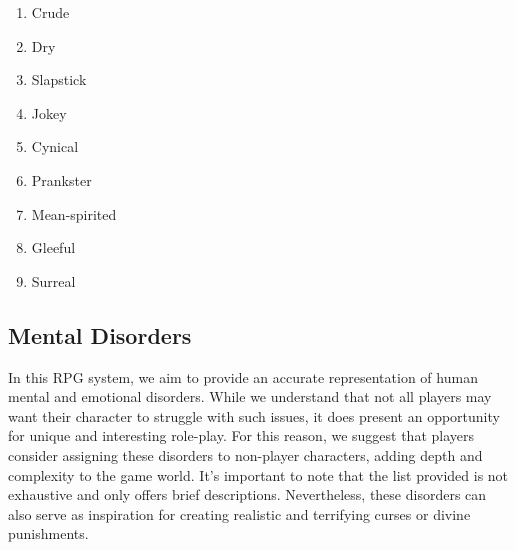 \begin{enumerate}[itemsep=0.4em]
    \item Crude
    \item Dry
    \item Slapstick
    \item Jokey
    \item Cynical
    \item Prankster
    \item Mean-spirited
    \item Gleeful
    \item Surreal
\end{enumerate}

\subsection{\textbf{Mental Disorders}}

In this RPG system, we aim to provide an accurate representation of human mental and emotional disorders. While we understand that not all players may want their character to struggle with such issues, it does present an opportunity for unique and interesting role-play. For this reason, we suggest that players consider assigning these disorders to non-player characters, adding depth and complexity to the game world. It's important to note that the list provided is not exhaustive and only offers brief descriptions. Nevertheless, these disorders can also serve as inspiration for creating realistic and terrifying curses or divine punishments.

